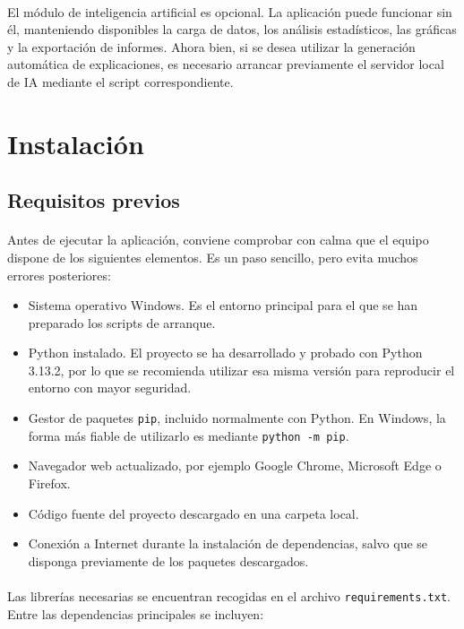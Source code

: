 \paragraph*{}El módulo de inteligencia artificial es opcional. La aplicación puede funcionar sin él, manteniendo disponibles la carga de datos, los análisis estadísticos, las gráficas y la exportación de informes. Ahora bien, si se desea utilizar la generación automática de explicaciones, es necesario arrancar previamente el servidor local de IA mediante el script correspondiente.

\section{Instalación}

\subsection{Requisitos previos}

\paragraph*{}Antes de ejecutar la aplicación, conviene comprobar con calma que el equipo dispone de los siguientes elementos. Es un paso sencillo, pero evita muchos errores posteriores:

\begin{itemize}
    \item Sistema operativo Windows. Es el entorno principal para el que se han preparado los scripts de arranque.
    \item Python instalado. El proyecto se ha desarrollado y probado con Python 3.13.2, por lo que se recomienda utilizar esa misma versión para reproducir el entorno con mayor seguridad.
    \item Gestor de paquetes \texttt{pip}, incluido normalmente con Python. En Windows, la forma más fiable de utilizarlo es mediante \texttt{python -m pip}.
    \item Navegador web actualizado, por ejemplo Google Chrome, Microsoft Edge o Firefox.
    \item Código fuente del proyecto descargado en una carpeta local.
    \item Conexión a Internet durante la instalación de dependencias, salvo que se disponga previamente de los paquetes descargados.
\end{itemize}

\paragraph*{}Las librerías necesarias se encuentran recogidas en el archivo \texttt{requirements.txt}. Entre las dependencias principales se incluyen:

